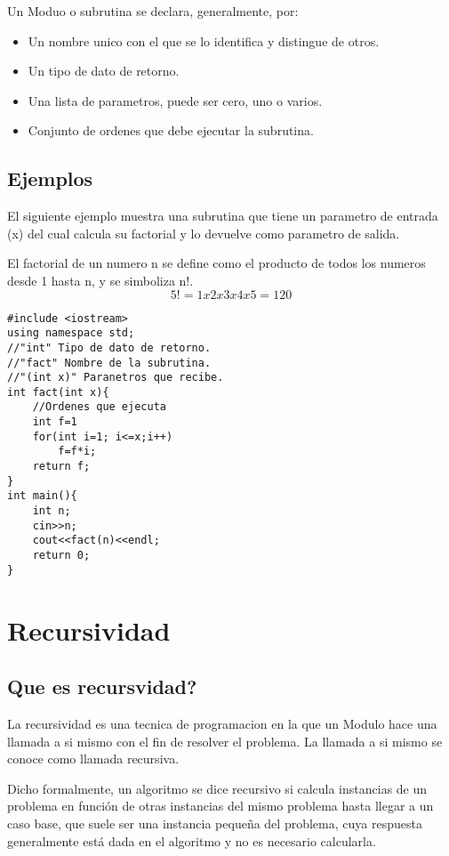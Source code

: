 Un Moduo o subrutina se declara, generalmente, por:
\begin{itemize}
\item Un nombre unico con el que se lo identifica y distingue de otros.
\item Un tipo de dato de retorno.
\item Una lista de parametros, puede ser cero, uno o varios.
\item Conjunto de ordenes que debe ejecutar la subrutina.
\end{itemize}

\subsection{Ejemplos}

El siguiente ejemplo muestra una subrutina que tiene un parametro de entrada (x) del cual calcula su factorial y lo devuelve como parametro de salida.

El factorial de un numero n se define como el producto de todos los numeros desde 1 hasta n, y se simboliza n!. 
\[
5!=1x2x3x4x5=120
\]

\begin{lstlisting}[style=Cpp, label=fact, caption=Factorial]
#include <iostream>  
using namespace std;
//"int" Tipo de dato de retorno.
//"fact" Nombre de la subrutina.
//"(int x)" Paranetros que recibe.
int fact(int x){
	//Ordenes que ejecuta
	int f=1
	for(int i=1; i<=x;i++)
		f=f*i;
	return f;
}
int main(){
	int n;
	cin>>n;
	cout<<fact(n)<<endl;
	return 0;
}
\end{lstlisting}

\section{Recursividad}

\subsection{Que es recursvidad?}

La recursividad es una tecnica de programacion en la que un Modulo hace una llamada a si mismo con el fin de resolver el problema. La llamada a si mismo se conoce como llamada recursiva.

Dicho formalmente, un algoritmo se dice recursivo si calcula instancias de un problema en función de otras instancias del mismo problema hasta llegar a un caso base, que suele ser una instancia pequeña del problema, cuya respuesta generalmente está dada en el algoritmo y no es necesario calcularla.

